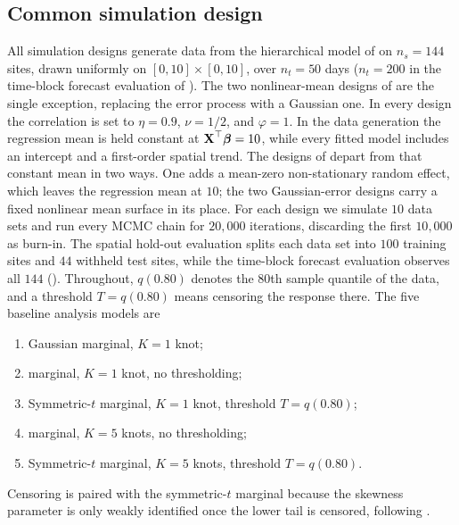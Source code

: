 \documentclass[12pt]{article}
\begin{document}
\subsection{Common simulation design}\label{sec:sim-design}

All simulation designs generate data from the hierarchical model of  on $n_s = 144$ sites, drawn uniformly on $[0,10] \times [0,10]$, over $n_t = 50$ days ($n_t = 200$ in the time-block forecast evaluation of ).  The two nonlinear-mean designs of  are the single exception, replacing the \skewt error process with a Gaussian one.  In every design the \Matern correlation  is set to $\eta = 0.9$, $\nu = 1/2$, and $\varphi = 1$.  In the data generation the regression mean is held constant at $\mbox{\bf X}^\top \mbox{\boldmath $\beta$} = 10$, while every fitted model includes an intercept and a first-order spatial trend.  The designs of  depart from that constant mean in two ways.  One adds a mean-zero non-stationary random effect, which leaves the regression mean at $10$; the two Gaussian-error designs carry a fixed nonlinear mean surface in its place.  For each design we simulate $10$ data sets and run every MCMC chain for $20{,}000$ iterations, discarding the first $10{,}000$ as burn-in.  The spatial hold-out evaluation splits each data set into $100$ training sites and $44$ withheld test sites, while the time-block forecast evaluation observes all $144$ ().  Throughout, $q(0.80)$ denotes the $80$th sample quantile of the data, and a threshold $T = q(0.80)$ means censoring the response there.  The five baseline analysis models are
\begin{enumerate}[leftmargin=3em]
  \item Gaussian marginal, $K = 1$ knot;
  \item \Skewt marginal, $K = 1$ knot, no thresholding;
  \item Symmetric-$t$ marginal, $K = 1$ knot, threshold $T = q(0.80)$;
  \item \Skewt marginal, $K = 5$ knots, no thresholding;
  \item Symmetric-$t$ marginal, $K = 5$ knots, threshold $T = q(0.80)$.
\end{enumerate}

Censoring is paired with the symmetric-$t$ marginal because the skewness parameter is only weakly identified once the lower tail is censored, following \textcite{morris_space-time_2017}.
\end{document}
